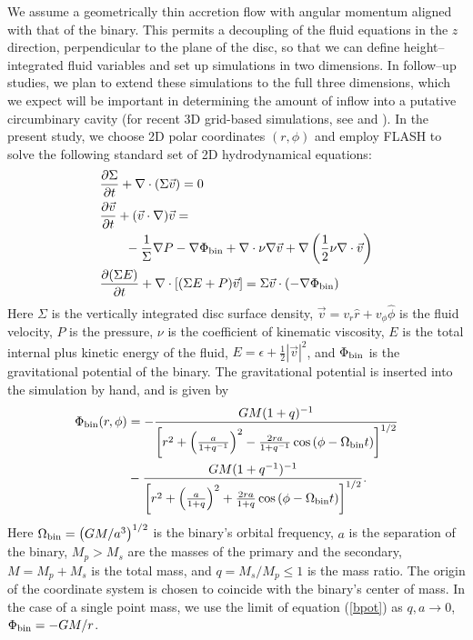 We assume a geometrically thin accretion flow with angular momentum aligned with that of the binary. This
permits a decoupling of the fluid equations in the $z$ direction,
perpendicular to the plane of the disc, so that we can define
height--integrated fluid variables and set up simulations in two
dimensions.  In follow--up studies, we plan to extend these
simulations to the full three dimensions, which we expect will be
important in determining the amount of inflow into a putative
circumbinary cavity (for recent 3D grid-based simulations, see
\citealt{ShiKrolik:2012} and \citealt{Noble+2012}). In the present
study, we choose 2D polar coordinates $(r, \phi)$ and employ FLASH to
solve the following standard set of 2D hydrodynamical equations:
%
\begin{align}
&{ \frac{\partial \Sigma}{\partial{t}} } + \nabla \cdot (\Sigma \vec{v}) = 0     \nonumber \\ \nonumber
&{ \frac{\partial \vec{v }}{\partial{t}} } + (\vec{v} \cdot \nabla) \vec{v} =  \\ \nonumber
& \qquad -{\frac{1}{\Sigma}} \nabla P  - \nabla \Phi_{\rm bin} + \nabla \cdot \nu \nabla \vec{v}  + \nabla \left( \frac{1}{2} \nu \nabla \cdot \vec{v} \right)\\
&{ \frac{\partial (\Sigma E)}{\partial{t}} } + \nabla \cdot \left[ (\Sigma E + P)\vec{v}\right] = \Sigma \vec{v} \cdot (-\nabla \Phi_{\rm{bin}})  
\label{fluideqns}
\end{align}
%
Here $\Sigma$ is the vertically integrated disc surface density,
$\vec{v} = v_r \hat{r} + v_{\phi} \hat \phi$ is the fluid velocity,
$P$ is the pressure, $\nu$ is the coefficient of kinematic viscosity,
$E$ is the total internal plus kinetic energy of the fluid, $E =
\epsilon + \frac{1}{2} |\vec{v}|^2$, and $\Phi_{\rm{bin}}$ is the
gravitational potential of the binary.  The gravitational potential is
inserted into the simulation by hand, and is given by
%
\begin{align}
\Phi_{\rm{bin}}(r, \phi) &= -\frac{GM(1+q)^{-1}}{ \left[r^2 + \left(\frac{a}{1+q^{-1}}\right)^2 - \frac{2ra}{1+q^{-1}} \cos{\left(\phi - \Omega_{\rm{bin}} t \right)} \right]^{1/2}  }    \nonumber \\
 &  - \frac{GM(1+q^{-1})^{-1}}{ \left[ r^2 + \left(\frac{a}{1+q}\right)^2 + \frac{2ra}{1+q} \cos{\left(\phi - \Omega_{\rm{bin}} t \right)}   \right]^{1/2} }.
 \label{bpot}
\end{align}
%
Here $\Omega_{\rm bin} = \left( GM/a^3\right)^{1/2}$ is the binary's
orbital frequency, $a$ is the separation of the binary, $M_p > M_s$
are the masses of the primary and the secondary, $M=M_p+M_s$ is the
total mass, and $q = M_s/M_p \leq 1$ is the mass ratio.  The origin of
the coordinate system is chosen to coincide with the binary's center of
mass. In the case of a single point mass, we use the limit of equation (\ref{bpot}) as 
$q, a \rightarrow 0$, $\Phi_{\rm{bin}} = - GM/r$. 

